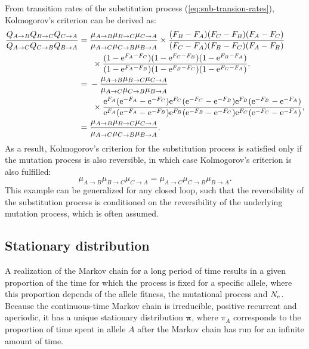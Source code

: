 From transition rates of the substitution process (\ref{eq:sub-transion-rates}), Kolmogorov's criterion can be derived as:
\begin{align}
    \dfrac{Q_{A \to B}Q_{B \to C}Q_{C \to A}}{Q_{A \to C}Q_{C \to B}Q_{B \to A}}
    ={}& \dfrac{\mu_{A \to B}\mu_{B \to C}\mu_{C \to A}}{\mu_{A \to C}\mu_{C \to B}\mu_{B \to A}}
    \times \dfrac{(F_{B} - F_{A})(F_{C} - F_{B})(F_{A} - F_{C})}{(F_{C} - F_{A})(F_{B} - F_{C})(F_{A} - F_{B})}
    \notag \\
    &\ \times \dfrac{( 1 - \mathrm{e}^{F_{A} - F_{C}} )( 1 - \mathrm{e}^{F_{C} - F_{B}} )( 1 - \mathrm{e}^{F_{B} - F_{A}} )}{( 1 - \mathrm{e}^{F_{A} - F_{B}} )( 1 - \mathrm{e}^{F_{B} - F_{C}} )( 1 - \mathrm{e}^{F_{C} - F_{A}} )}, \\
    ={}& - \dfrac{\mu_{A \to B}\mu_{B \to C}\mu_{C \to A}}{\mu_{A \to C}\mu_{C \to B}\mu_{B \to A}} \notag \\
    &\ \times \dfrac{\mathrm{e}^{F_{A}}( \mathrm{e}^{-F_{A}} - \mathrm{e}^{ - F_{C}} )\mathrm{e}^{F_{C}}( \mathrm{e}^{-F_{C}}
    - \mathrm{e}^{ - F_{B}} )\mathrm{e}^{F_{B}}( \mathrm{e}^{-F_{B}} - \mathrm{e}^{ - F_{A}} )}{\mathrm{e}^{F_{A}}( \mathrm{e}^{-F_{A}} - \mathrm{e}^{ - F_{B}} )\mathrm{e}^{F_{B}}( \mathrm{e}^{-F_{B}} - \mathrm{e}^{ - F_{C}} )\mathrm{e}^{F_{C}}( \mathrm{e}^{-F_{C}} - \mathrm{e}^{ - F_{A}} )}, \\
    ={}& \dfrac{\mu_{A \to B}\mu_{B \to C}\mu_{C \to A}}{\mu_{A \to C}\mu_{C \to B}\mu_{B \to A}}.
\end{align}
As a result, Kolmogorov's criterion for the substitution process is satisfied only if the mutation process is also reversible, in which case Kolmogorov's criterion is also fulfilled:
\begin{equation}
    \mu_{A \to B}\mu_{B \to C}\mu_{C \to A}=\mu_{A \to C}\mu_{C \to B}\mu_{B \to A}.
\end{equation}
This example can be generalized for any closed loop, such that the reversibility of the substitution process is conditioned on the reversibility of the underlying mutation process, which is often assumed.

\subsection{Stationary distribution}

A realization of the Markov chain for a long period of time results in a given proportion of the time for which the process is fixed for a specific allele, where this proportion depends of the allele fitness, the mutational process and $N_{\textrm{e}}$.
Because the continuous-time Markov chain is irreducible, positive recurrent and aperiodic, it has a unique stationary distribution $\bm{\pi}$, where $\pi_{A}$ corresponds to the proportion of time spent in allele $A$ after the Markov chain has run for an infinite amount of time.

